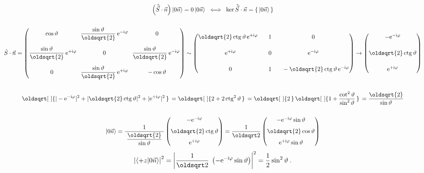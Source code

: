 \documentclass[10pt,a4paper]{article}
\renewcommand*{\sqrt}[2][\ ]{\oldsqrt[#1]{#2\,}\,}
\def\ph{\phantom}
\newcommand{\const}[1]{\text{#1}}
\newcommand{\mat}[1]{
    \begin{pmatrix}
        #1
    \end{pmatrix}
}
\newcommand{\ket}[1]{\left| #1 \right>}
\newcommand{\braket}[2]{\left< #1 \middle| #2 \right>}
\newcommand{\e}[1]{\const{e}^{#1}}
\renewcommand{\i}{\const{i}}
\newcommand{\vechat}[1]{\hat{\vec{#1}}}
\def\ctg{\operatorname{ctg}}
\begin{document}
\begin{gather*}
    \left(\vechat S \cdot \vec n\right) \ket{0\vec n} = 0 \ket{0\vec n}
    \;\iff\;
    \ker \vechat S \cdot \vec n = \{\, \ket{0 \vec n} \,\}
    \\\\
    \hat S \cdot \vec n
    = \mat{
        \cos \vartheta &
        \dfrac{\sin \vartheta}{\oldsqrt{2}} \, \e{-\i \varphi} &
        0
        \\[15pt]
        \dfrac{\sin \vartheta}{\oldsqrt{2}} \, \e{+\i \varphi} \!\!&
        0 & \!\!
        \dfrac{\sin \vartheta}{\oldsqrt{2}} \, \e{-\i \varphi}
        \\[15pt]
        0 &
        \dfrac{\sin \vartheta}{\oldsqrt{2}} \, \e{+\i \varphi} &
        -\cos \vartheta
    }
    \sim \mat{
        \oldsqrt{2} \ctg \vartheta \, \e{+\i \varphi} \ph{+}&
        1  &
        0
        \\[15pt]
        \e{+\i \varphi} &
        0 &
        \e{-\i \varphi}
        \\[15pt]
        0 &
        1 &
        \ph{+}-\oldsqrt{2} \ctg \vartheta \, \e{-\i \varphi}
    }
    \to \mat{
        -\e{-\i \varphi} \\[15pt]
        \oldsqrt{2} \ctg \vartheta \\[15pt]
        \e{+\i \varphi}
    }
    \\\\
    \sqrt{
        |-\e{-\i \varphi}|^2 +
        |\oldsqrt{2} \ctg \vartheta|^2 +
        |\e{+\i \varphi}|^2
    }
    = \sqrt{
        2 + 2 \ctg^2 \vartheta
    }
    = \sqrt{2} \sqrt{1 + \frac{\cot^2 \vartheta}{\sin^2 \vartheta}}
    = \frac{\oldsqrt{2}}{\sin \vartheta}
    \\\\
    \ket{0\vec n}
    =
    \frac{1}{\; \dfrac{\oldsqrt{2}}{\sin \vartheta} \;}
    \mat{
        -\e{-\i \varphi} \\[7pt]
        \oldsqrt{2} \ctg \vartheta \\[7pt]
        \e{+\i \varphi}
    }
    =
    \frac{1}{\oldsqrt 2}
    \mat{
        -\e{-\i \varphi} \sin \vartheta \\[7pt]
        \oldsqrt{2} \cos \vartheta \\[7pt]
        \e{+\i \varphi} \sin \vartheta
    }
\end{gather*}
\begin{gather*}
    \left| \braket{+z}{0\vec n} \right|^2
    = \left|
    \frac{1}{\oldsqrt 2} \; \left( -\e{-\i \varphi} \sin \vartheta \right) \right|^2
    = \frac{1}{2} \sin^2 \vartheta
    \: .
\end{gather*}
\end{document}
